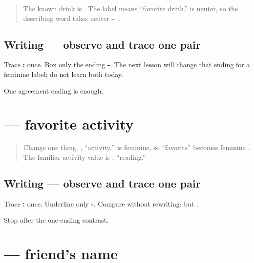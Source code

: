 \label{lesson:MR-A1F01-avdate-pey}



\begin{quote}
The known drink is \textbf{}. The label \textbf{ } means “favorite drink.” \textbf{} is neuter, so the describing word takes neuter \textbf{-}: \textbf{}.
\end{quote}

\subsection*{Writing — observe and trace one pair}
Trace \textbf{ : } once. Box only the ending \textbf{-}. The next lesson will change that ending for a feminine label; do not learn both today.

\begin{tcolorbox}[breakable,colback=teal!4,colframe=teal!35!black,title={Before you move on}]
One agreement ending is enough.
\end{tcolorbox}
\section[āvaḍtī kṛtī: vācaṇe]{  — favorite activity}

\label{lesson:MR-A1F01-avadti-kruti}



\begin{quote}
Change one thing. \textbf{}, “activity,” is feminine, so “favorite” becomes feminine \textbf{}. The familiar activity value is \textbf{}, “reading.”
\end{quote}

\subsection*{Writing — observe and trace one pair}
Trace \textbf{ : } once. Underline only \textbf{-}. Compare without rewriting: \textbf{ } but \textbf{ }.

\begin{tcolorbox}[breakable,colback=teal!4,colframe=teal!35!black,title={Before you move on}]
Stop after the one-ending contrast.
\end{tcolorbox}
\section[mitrāce nāv: Aruṇ]{  — friend's name}

